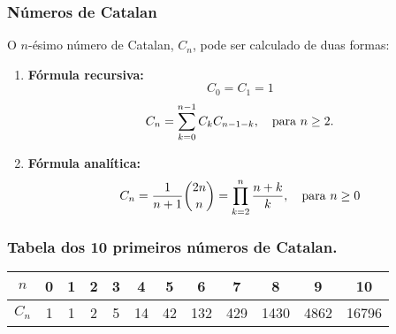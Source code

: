 \subsubsection{Números de Catalan}
O $n$-ésimo número de Catalan, $C_n$, pode ser calculado de duas formas:
\begin{enumerate}
    \item \textbf{Fórmula recursiva:} 
    $$C_0 = C_1 = 1$$
    $$C_n = \sum_{k = 0}^{n-1}C_kC_{n-1-k}, \quad \textnormal{para } n \ge 2.$$

    \item \textbf{Fórmula analítica:}
    $$C_n = \frac{1}{n+1} \binom{2n}{n} = \prod_{k=2}^{n} \frac{n+k}{k}, \quad \textnormal{para } n \ge 0$$
\end{enumerate}

\subsubsection*{Tabela dos 10 primeiros números de Catalan.}
\begin{center}
    \begin{tabular}{|c | c c c c c c c c c c c |}
        $n$ & 0 &1& 2& 3& 4& 5& 6& 7& 8& 9& 10 \\
        \hline
        $C_n$ & 1& 1& 2& 5& 14& 42& 132& 429& 1430& 4862& 16796 \\
    \end{tabular}
\end{center}

